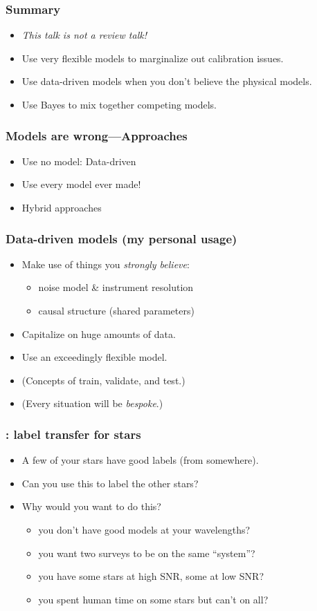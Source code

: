 \documentclass[pdftex]{beamer}
\newcommand{\conclusions}{%
\begin{frame}
  \frametitle{Summary}
  \begin{itemize}
  \item \textit{This talk is not a review talk!}
  \item Use very flexible models to marginalize out calibration issues.
  \item Use data-driven models when you don't believe the physical models.
  \item Use Bayes to mix together competing models.
  \end{itemize}
\end{frame}}
\begin{document}
\conclusions

\begin{frame}
  \frametitle{Models are wrong---Approaches}
  \begin{itemize}
  \item Use no model: Data-driven
  \item Use every model ever made!
  \item Hybrid approaches
  \end{itemize}
\end{frame}

\begin{frame}
  \frametitle{Data-driven models (my personal usage)}
  \begin{itemize}
  \item Make use of things you \emph{strongly believe}:
    \begin{itemize}
    \item noise model \& instrument resolution
    \item causal structure (shared parameters)
    \end{itemize}
  \item Capitalize on huge amounts of data.
  \item Use an exceedingly flexible model.
  \item (Concepts of train, validate, and test.)
  \item (Every situation will be \emph{bespoke}.)
  \end{itemize}
\end{frame}

\begin{frame}
  \frametitle{\tc: label transfer for stars}
  \begin{itemize}
  \item A few of your stars have good labels (from somewhere).
  \item Can you use this to label the other stars?
  \item Why would you want to do this?
    \begin{itemize}
    \item<2> you don't have good models at your wavelengths?
    \item<2> you want two surveys to be on the same ``system''?
    \item<2> you have some stars at high SNR, some at low SNR?
    \item<2> you spent human time on some stars but can't on all?
    \end{itemize}
  \end{itemize}
\end{frame}
\end{document}
